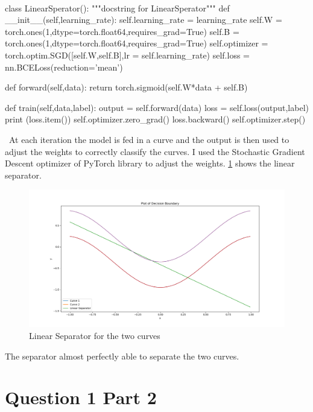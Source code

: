 \documentclass[12pt]{report}
\begin{document}
\

\begin{python}
class LinearSperator():
	"""docstring for LinearSperator"""
	def __init__(self,learning_rate):
		self.learning_rate = learning_rate
		self.W = torch.ones(1,dtype=torch.float64,requires_grad=True)
		self.B = torch.ones(1,dtype=torch.float64,requires_grad=True)
		self.optimizer = torch.optim.SGD([self.W,self.B],lr = self.learning_rate)
		self.loss = nn.BCELoss(reduction='mean')


	def forward(self,data):
		return torch.sigmoid(self.W*data + self.B)


	def train(self,data,label):
		output = self.forward(data)
		loss = self.loss(output,label)
		print (loss.item())
		self.optimizer.zero_grad()
		loss.backward()
		self.optimizer.step()
\end{python}

\
At each iteration the model is fed in a curve and the output is then used to adjust the weights to correctly classify the curves. I used the Stochastic Gradient Descent optimizer of PyTorch library to adjust the weights. \figurename{\ref{fig:2}} shows the linear separator.

\begin{figure}[H]
	\begin{center}
		\includegraphics[scale = 0.3]{que1_seperator}
		\caption{Linear Separator for the two curves}
		\label{fig:2}
	\end{center}
\end{figure} 

 The separator almost perfectly able to separate the two curves.
 
\section{Question 1 Part 2}
\end{document}
